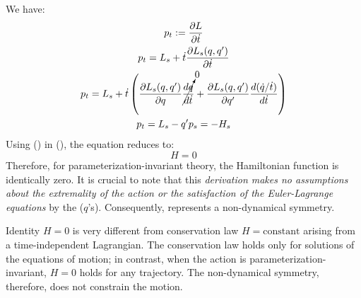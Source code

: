 We have:
\begin{equation}
	\label{eq:conh_pt}
	\begin{gathered}
		p_t := \frac{\partial L}{\partial\dot{t}}\\
		p_t = L_s + \dot{t} \frac{\partial L_s(q, q')}{\partial\dot{t}}\\
		p_t = L_s + \dot{t} \left(\frac{\partial L_s(q, q')}{\partial q} \cancelto{0}{\frac{d q}{d \dot{t}}} +
		\frac{\partial L_s(q, q')}{\partial q'} \frac{d (\dot{q}/\dot{t})}{d \dot{t}}
		\right) \\
		p_t = L_s - q'p_s = - H_s
	\end{gathered}
\end{equation}
Using () in (), the equation reduces to:
\begin{equation}
	\label{eq:H0}
	\boxed{H = 0}
\end{equation}
Therefore, for parameterization-invariant theory, the Hamiltonian function 
is identically zero. It is crucial to note that this \emph{derivation makes no 
assumptions about the extremality of the action or the satisfaction of the 
Euler-Lagrange equations} by the ($q$'s). Consequently, 
represents a non-dynamical symmetry.

Identity $H = 0$ is very different from conservation law $H = \mathrm{constant}$ arising
from a time-independent Lagrangian. The conservation law holds only for solutions of the
equations of motion; in contrast, when the action is parameterization-invariant, 
$H = 0$ holds for any trajectory. The non-dynamical symmetry, therefore, does not
constrain the motion.